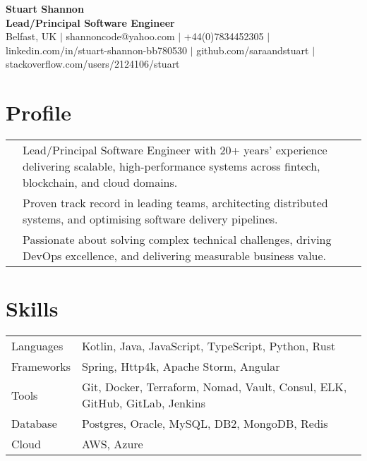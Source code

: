 \documentclass[2pt,a4paper]{article}
\newlength{\datecolumn}
\newlength{\textcolumn}
\begin{document}
\begin{center}
    {\LARGE \textbf{Stuart Shannon}} \\
    {\normalsize \textbf{Lead/Principal Software Engineer}} \\
    \vspace{0.2cm}
    Belfast, UK \quad \(|\) \quad shannoncode@yahoo.com \quad \(|\) \quad +44(0)7834452305 \quad \(|\) \quad linkedin.com/in/stuart-shannon-bb780530 \quad \(|\) \quad github.com/saraandstuart \quad \(|\) \quad stackoverflow.com/users/2124106/stuart 
\end{center}

\section*{Profile}
\begin{tabular}{p{\datecolumn} p{\textcolumn}}
& Lead/Principal Software Engineer with 20+ years’ experience delivering scalable, high-performance systems across fintech, blockchain, and cloud domains. \\
& Proven track record in leading teams, architecting distributed systems, and optimising software delivery pipelines. \\
& Passionate about solving complex technical challenges, driving DevOps excellence, and delivering measurable business value. \\
\end{tabular}

\section*{Skills}
\begin{tabular}{p{\datecolumn} p{\textcolumn}}
Languages  & Kotlin, Java, JavaScript, TypeScript, Python, Rust \\
Frameworks & Spring, Http4k, Apache Storm, Angular \\
Tools      & Git, Docker, Terraform, Nomad, Vault, Consul, ELK, GitHub, GitLab, Jenkins \\
Database   & Postgres, Oracle, MySQL, DB2, MongoDB, Redis \\
Cloud      & AWS, Azure \\
\end{tabular}
\end{document}
